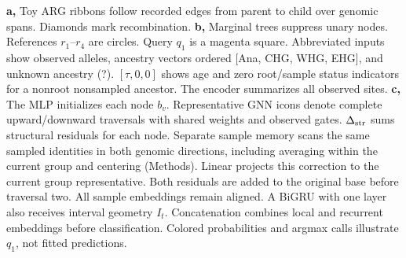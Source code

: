 \textbf{a,} Toy ARG ribbons follow recorded edges from parent to child over genomic spans. Diamonds mark recombination.
\textbf{b,} Marginal trees suppress unary nodes. References $r_1$--$r_4$ are circles. Query $q_1$ is a magenta square. Abbreviated inputs show observed alleles, ancestry vectors ordered [Ana, CHG, WHG, EHG], and unknown ancestry (?). $[\tau,0,0]$ shows age and zero root/sample status indicators for a nonroot nonsampled ancestor. The encoder summarizes all observed sites.
\textbf{c,} The MLP initializes each node $b_v$. Representative GNN icons denote complete upward/downward traversals with shared weights and observed gates. $\Delta_{\rm str}$ sums structural residuals for each node. Separate sample memory scans the same sampled identities in both genomic directions, including averaging within the current group and centering (Methods). Linear projects this correction to the current group representative. Both residuals are added to the original base before traversal two. All sample embeddings remain aligned. A BiGRU with one layer also receives interval geometry $I_t$. Concatenation combines local and recurrent embeddings before classification. Colored probabilities and argmax calls illustrate $q_1$, not fitted predictions.
